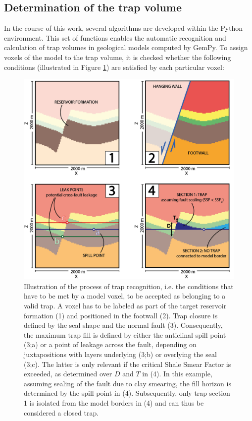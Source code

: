 		\subsection{Determination of the trap volume}
		In the course of this work, several algorithms are developed within the Python environment. This set of functions enables the automatic recognition and calculation of trap volumes in geological models computed by GemPy. To assign voxels of the model to the trap volume, it is checked whether the following conditions (illustrated in Figure \ref{fig:trap_recognition}) are satisfied by each particular voxel: 
		\begin{figure}[p!]
			\centering
			\includegraphics[width=1\textwidth]{Figures/Trap_Cond_H.png}
			\caption{Illustration of the process of trap recognition, i.e. the conditions that have to be met by a model voxel, to be accepted as belonging to a valid trap. A voxel has to be labeled as part of the target reservoir formation (1) and positioned in the footwall (2). Trap closure is defined by the seal shape and the normal fault (3). Consequently, the maximum trap fill is defined by either the anticlinal spill point (3;a) or a point of leakage across the fault, depending on juxtapositions with layers underlying (3;b) or overlying the seal (3;c). The latter is only relevant if the critical Shale Smear Factor is exceeded, as determined over $D$ and $T$ in (4). In this example, assuming sealing of the fault due to clay smearing, the fill horizon is determined by the spill point in (4). Subsequently, only trap section 1 is isolated from the model borders in (4) and can thus be considered a closed trap.}\label{fig:trap_recognition}
		\end{figure}
